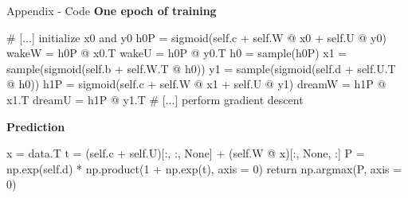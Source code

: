 \documentclass[10pt]{beamer}
\begin{document}
\begin{frame}[fragile]{Appendix - Code}
\textbf{One epoch of training}
\begin{python}
# [...] initialize x0 and y0
h0P = sigmoid(self.c + self.W @ x0 + self.U @ y0)
wakeW = h0P @ x0.T
wakeU = h0P @ y0.T
h0 = sample(h0P)
x1 = sample(sigmoid(self.b + self.W.T @ h0))
y1 = sample(sigmoid(self.d + self.U.T @ h0))
h1P = sigmoid(self.c + self.W @ x1 + self.U @ y1)
dreamW = h1P @ x1.T
dreamU = h1P @ y1.T
# [...] perform gradient descent
\end{python}

\textbf{Prediction}
\begin{python}
x = data.T
t = (self.c + self.U)[:, :, None] + (self.W @ x)[:, None, :]
P = np.exp(self.d) * np.product(1 + np.exp(t), axis = 0)
return np.argmax(P, axis = 0)
\end{python}
\end{frame}
\end{document}
